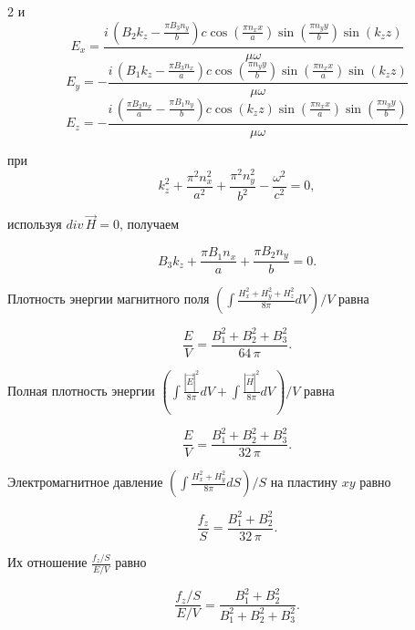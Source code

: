 \documentclass[twoside, 10pt]{article}
\begin{document}
\begin{multicols}{2}
    и
\[E_{x} = \frac{i \, {\left(B_{2} k_{z} - \frac{\pi B_{3} n_{y}}{b}\right)} c \cos\left(\frac{\pi n_{x} x}{a}\right) \sin\left(\frac{\pi n_{y} y}{b}\right) \sin\left(k_{z} z\right)}{\mu \omega}\]
\[E_{y} = -\frac{i \, {\left(B_{1} k_{z} - \frac{\pi B_{3} n_{x}}{a}\right)} c \cos\left(\frac{\pi n_{y} y}{b}\right) \sin\left(\frac{\pi n_{x} x}{a}\right) \sin\left(k_{z} z\right)}{\mu \omega}\]
\[E_{z} = -\frac{i \, {\left(\frac{\pi B_{2} n_{x}}{a} - \frac{\pi B_{1} n_{y}}{b}\right)} c \cos\left(k_{z} z\right) \sin\left(\frac{\pi n_{x} x}{a}\right) \sin\left(\frac{\pi n_{y} y}{b}\right)}{\mu \omega}\]

    при
\begin{equation}k_{z}^{2} + \frac{\pi^{2} n_{x}^{2}}{a^{2}} + \frac{\pi^{2} n_{y}^{2}}{b^{2}} - \frac{\omega^{2}}{c^{2}} = 0,\end{equation}

    используя \(div\,\vec{H} = 0\), получаем

\begin{equation}B_{3} k_{z} + \frac{\pi B_{1} n_{x}}{a} + \frac{\pi B_{2} n_{y}}{b} = 0.\end{equation}

    Плотность энергии магнитного поля
\(\left(\int \frac{H_x^2+H_y^2+H_z^2}{8 \pi}dV\right)\big/{V}\) равна

\begin{equation}\frac{E}{V} = \frac{{B_{1}^{2} + B_{2}^{2} + B_{3}^{2}}}{64 \, \pi}.\end{equation}

    Полная плотность энергии
\(\left(\int \frac{|\vec{E}|^2}{8 \pi}dV + \int \frac{|\vec{H}|^2}{8 \pi}dV\right)\big/{V}\) равна

\begin{equation}\frac{E}{V} = \frac{{B_{1}^{2} + B_{2}^{2} + B_{3}^{2}}}{32 \, \pi}.\end{equation}

    Электромагнитное давление
\(\left({\int \frac {H_x^2+H_y^2}{8 \pi} dS}\right)\big/{S}\) на пластину \(xy\) равно

\begin{equation}\frac{f_z}{S}=\frac{{B_{1}^{2} + B_{2}^{2}}}{32 \, \pi}.\end{equation}

Их отношение \(\frac{f_z/S}{E/V}\) равно

\begin{equation}\frac{f_z/S}{E/V} = \frac{{B_{1}^{2} + B_{2}^{2}}}{B_{1}^{2} + B_{2}^{2} + B_{3}^{2}}.\end{equation}


\end{multicols}
\end{document}
